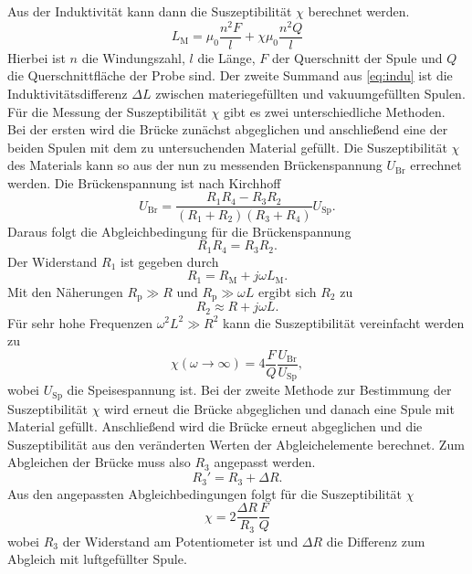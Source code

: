 Aus der Induktivität kann dann die Suszeptibilität $\chi$ berechnet werden.
\begin{equation}
\label{eq:indu}
L_\text{M} = \mu_0 \frac{n^2F}{l} + \chi \mu_0 \frac{n^2Q}{l}
\end{equation}
Hierbei ist $n$ die Windungszahl, $l$ die Länge, $F$ der Querschnitt der Spule und $Q$ die Querschnittfläche der Probe sind.
Der zweite Summand aus \autoref{eq:indu} ist die Induktivitätsdifferenz $\Delta L$ zwischen materiegefüllten und vakuumgefüllten Spulen.
Für die Messung der Suszeptibilität $\chi$ gibt es zwei unterschiedliche Methoden.
Bei der ersten wird die Brücke zunächst abgeglichen und anschließend eine der beiden Spulen mit dem zu untersuchenden
Material gefüllt. Die Suszeptibilität $\chi$ des Materials kann so aus der nun zu messenden Brückenspannung $U_\text{Br}$ errechnet werden.
Die Brückenspannung ist nach Kirchhoff
\begin{equation*}
U_\text{Br} = \frac{R_1R_4-R_3R_2}{(R_1+R_2)(R_3+R_4)}U_\text{Sp}.
\end{equation*}
Daraus folgt die Abgleichbedingung für die Brückenspannung
\begin{equation*}
R_1R_4 = R_3R_2.
\end{equation*}
Der Widerstand $R_1$ ist gegeben durch
\begin{equation*}
R_1 = R_\text{M} + j \omega L_\text{M}.
\end{equation*}
Mit den Näherungen $R_\text{p} \gg R $ und $R_\text{p} \gg \omega L$ ergibt sich $R_2$ zu
\begin{equation*}
R_2 \approx R + j \omega L.
\end{equation*}
Für sehr hohe Frequenzen $\omega^2 L^2 \gg R^2$ kann die Suszeptibilität vereinfacht werden zu
\begin{equation}
\chi(\omega \rightarrow \infty) = 4 \frac{F}{Q}\frac{U_\text{Br}}{U_\text{Sp}},
\end{equation}
wobei $U_\text{Sp}$ die Speisespannung ist.
Bei der zweite Methode zur Bestimmung der Suszeptibilität $\chi$ wird erneut die Brücke abgeglichen und danach eine Spule mit Material gefüllt. Anschließend wird die Brücke erneut
abgeglichen und die Suszeptibilität aus den veränderten Werten der Abgleichelemente berechnet.
Zum Abgleichen der Brücke muss also $R_3$ angepasst werden.
\begin{equation*}
R_3' = R_3 + \Delta R.
\end{equation*}
Aus den angepassten Abgleichbedingungen folgt für die Suszeptibilität $\chi$
\begin{equation}
\chi = 2 \frac{\Delta R}{R_3}\frac{F}{Q}
\end{equation}
wobei $R_3$ der Widerstand am Potentiometer ist und $\Delta R$ die Differenz zum Abgleich mit luftgefüllter Spule.

\cite{Anleitung606}
